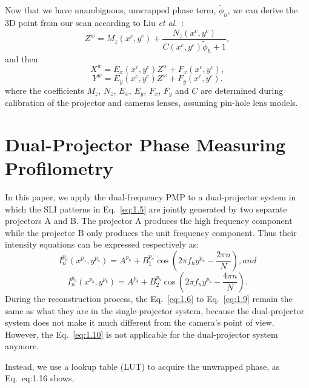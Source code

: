 \documentclass[]{spie}  %
\begin{document}
Now that we have unambiguous, unwrapped phase term, $\tilde{\phi}_h$, we can derive the 3D point from our scan according to Liu \textit{et al}.~\cite{liuk10}:
\begin{equation}\label{eq:1.11}
	Z^w = M_z(x^c, y^c) + \frac{N_z(x^c, y^c)}{C(x^c, y^c) \tilde{\phi}_h + 1},
\end{equation}
and then
\begin{equation}\label{eq:1.12}
	X^w = E_x(x^c, y^c)Z^w + F_x(x^c, y^c),
\end{equation}
\begin{equation}\label{eq:1.13}
	Y^w = E_y(x^c, y^c)Z^w + F_y(x^c, y^c).
\end{equation}
where the coefficients $M_z$, $N_z$, $E_x$, $E_y$, $F_x$, $F_y$ and $C$ are determined during calibration of the projector and cameras lenses, assuming pin-hole lens models.


\section{Dual-Projector Phase Measuring Profilometry}
In this paper, we apply the dual-frequency PMP to a dual-projector system in which the SLI patterns in Eq.~\eqref{eq:1.5} are jointly generated by two separate projectors A and B. The projector A produces the high frequency component while the projector B only produces the unit frequency component. Thus their intensity equations can be expressed respectively as:
   \begin{equation} \label{eq:1.14}
  	I^{p_a}_n(x^{p_a}, y^{p_a}) = A^{p_a} + B^{p_a}_1\cos\left(2\pi f_h y^{p_a} - \frac{2\pi n}{N}\right), and 
  \end{equation}
   \begin{equation} \label{eq:1.15}
  	I^{p_b}_n(x^{p_b}, y^{p_b}) = A^{p_b} + B^{p_b}_2\cos\left(2\pi f_u y^{p_b} - \frac{4\pi n}{N}\right).
  \end{equation}
During the reconstruction process, the Eq.~\eqref{eq:1.6} to Eq.~\eqref{eq:1.9} remain the same as what they are in the single-projector system, because the dual-projector system does not make it much different from the camera's point of view. However, the Eq.~\eqref{eq:1.10} is not applicable for the dual-projector system anymore. 

Instead, we use a lookup table (LUT) to acquire the unwrapped phase, as Eq.~{eq:1.16} shows,
\end{document}

